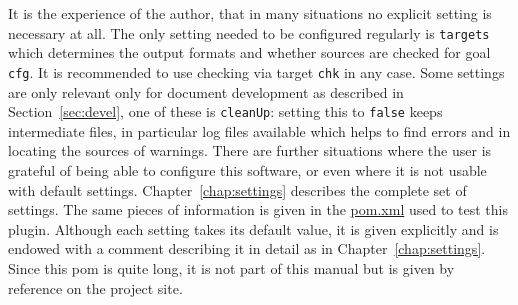 It is the experience of the author, 
that in many situations no explicit setting is necessary at all. 
The only setting needed to be configured regularly is \texttt{targets} 
which determines the output formats and whether sources are checked 
for goal \texttt{cfg}. 
It is recommended to use checking via target \texttt{chk} in any case. 
Some settings are only relevant only for document development 
as described in Section~\ref{sec:devel}, 
one of these is \texttt{cleanUp}: setting this to \texttt{false} 
keeps intermediate files, in particular log files available 
which helps to find errors and in locating the sources of warnings. 
There are further situations where the user is grateful 
of being able to configure this software, 
or even where it is not usable with default settings. 
Chapter~\ref{chap:settings} describes the complete set of settings. 
The same pieces of information 
is given in the \href{\urlSite fromMain/pom4pdf.xml}{pom.xml} 
used to test this plugin. 
Although each setting takes its default value, 
it is given explicitly and is endowed with a comment 
describing it in detail as in Chapter~\ref{chap:settings}. 
Since this pom is quite long, it is not part of this manual 
but is given by reference on the project site. 


